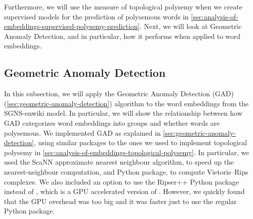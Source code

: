Furthermore, we will use the measure of topological polysemy when we create supervised models for the prediction of polysemous words in \cref{sec:analysis-of-embeddings-supervised-polysemy-prediction}. Next, we will look at Geometric Anomaly Detection, and in particular, how it performs when applied to word embeddings.

\subsection{Geometric Anomaly Detection}
\label{sec:analysis-of-embeddings-geometric-anomaly-detection}
In this subsection, we will apply the Geometric Anomaly Detection (GAD) (\cref{sec:geometric-anomaly-detection}) algorithm to the word embeddings from the SGNS-enwiki model. In particular, we will show the relationship between how GAD categorizes word embeddings into groups and whether words are polysemous. We implemented GAD as explained in \cref{sec:geometric-anomaly-detection}, using similar packages to the ones we used to implement topological polysemy in \cref{sec:analysis-of-embeddings-topological-polysemy}. In particular, we used the ScaNN \cite{scann2020} approximate nearest neighbour algorithm, to speed up the nearest-neighbour computation, and  \cite{ctralie2018ripser} Python package, to compute Vietoris–Rips complexes. We also included an option to use the Ripser++ \cite{zhang2020ripserplusplus} Python package instead of , which is a GPU accelerated version of . However, we quickly found that the GPU overhead was too big and it was faster just to use the regular  Python package.

